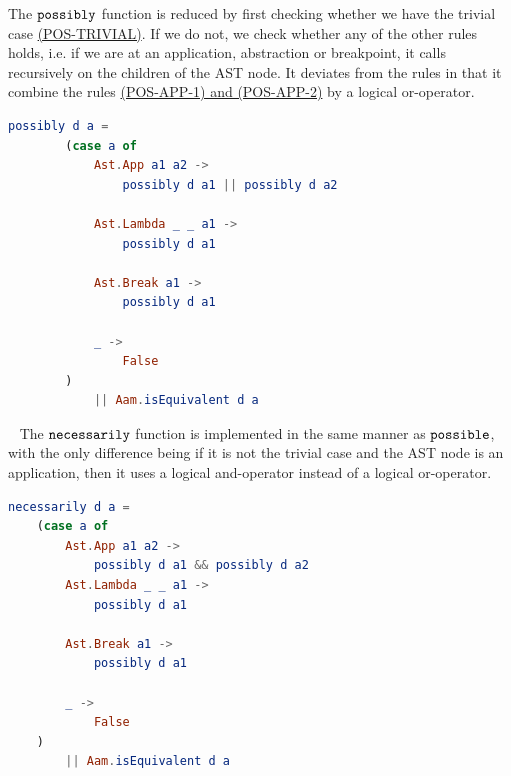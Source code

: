 The $\texttt{possibly}$ function is reduced by first checking whether we have the
trivial case \hyperref[fig:conditionreductionrules]{(POS-TRIVIAL)}. If we do
not, we check whether any of the other rules holds, i.e. if we are at an
application, abstraction or breakpoint, it calls recursively on the children of
the AST node. It deviates from the rules in that it combine the rules
\hyperref[fig:conditionreductionrules]{(POS-APP-1) and (POS-APP-2)} by a logical
or-operator.
\begin{lstlisting}[language=elm,%
                   label="eval-eed-possibly",%
                   gobble=4,%
                   ]
    possibly d a =
        (case a of
            Ast.App a1 a2 ->
                possibly d a1 || possibly d a2

            Ast.Lambda _ _ a1 ->
                possibly d a1

            Ast.Break a1 ->
                possibly d a1

            _ ->
                False
        )
            || Aam.isEquivalent d a
\end{lstlisting}
~
The $\texttt{necessarily}$ function is implemented in the same manner as
$\texttt{possible}$, with the only difference being if it is not the trivial case
and the AST node is an application, then it uses a logical and-operator instead
of a logical or-operator.
\begin{lstlisting}[language=elm,%
                   label="eval-eed-necessarily",%
                   gobble=0,%
                   ]
necessarily d a =
    (case a of
        Ast.App a1 a2 ->
            possibly d a1 && possibly d a2
        Ast.Lambda _ _ a1 ->
            possibly d a1

        Ast.Break a1 ->
            possibly d a1

        _ ->
            False
    )
        || Aam.isEquivalent d a
\end{lstlisting}
